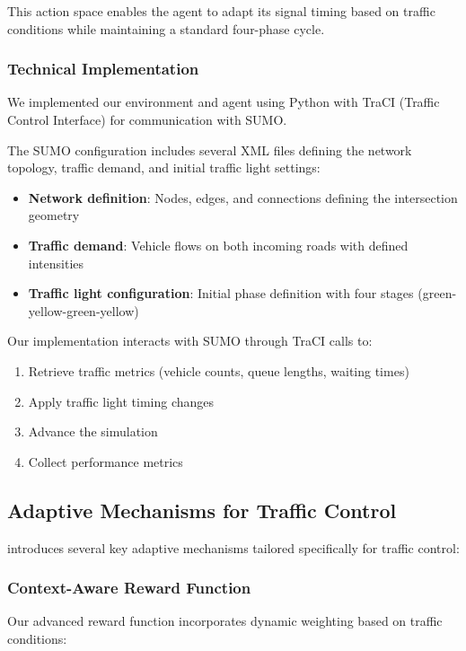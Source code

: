 This action space enables the agent to adapt its signal timing based on traffic conditions while maintaining a standard four-phase cycle.

\subsubsection{Technical Implementation}

We implemented our environment and agent using Python with TraCI (Traffic Control Interface) for communication with SUMO.

The SUMO configuration includes several XML files defining the network topology, traffic demand, and initial traffic light settings:

\begin{itemize}
    \item \textbf{Network definition}: Nodes, edges, and connections defining the intersection geometry
    \item \textbf{Traffic demand}: Vehicle flows on both incoming roads with defined intensities
    \item \textbf{Traffic light configuration}: Initial phase definition with four stages (green-yellow-green-yellow)
\end{itemize}

Our implementation interacts with SUMO through TraCI calls to:
\begin{enumerate}
    \item Retrieve traffic metrics (vehicle counts, queue lengths, waiting times)
    \item Apply traffic light timing changes
    \item Advance the simulation
    \item Collect performance metrics
\end{enumerate}

\subsection{Adaptive Mechanisms for Traffic Control}

\adaptiverl introduces several key adaptive mechanisms tailored specifically for traffic control:

\subsubsection{Context-Aware Reward Function}

Our advanced reward function incorporates dynamic weighting based on traffic conditions:

